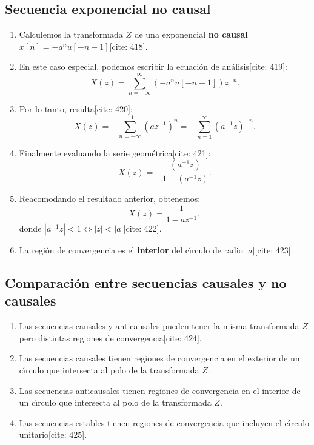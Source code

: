 \documentclass[11pt,a4paper,openany]{book}
\begin{document}
\subsection{Secuencia exponencial no causal}
\begin{enumerate}
	\item Calculemos la transformada $Z$ de una exponencial \textbf{no causal} $x[n] = -a^{n} u[-n-1]$[cite: 418].
	\item En este caso especial, podemos escribir la ecuación de análisis[cite: 419]:
	\begin{equation}
		X(z) = \sum_{n=-\infty}^{\infty} \left( -a^{n} u[-n-1] \right) z^{-n}.
	\end{equation}
	\item Por lo tanto, resulta[cite: 420]:
	\begin{equation}
		X(z) = -\sum_{n=-\infty}^{-1} (a z^{-1})^{n} = -\sum_{n=1}^{\infty} (a^{-1} z)^{-n}.
	\end{equation}
	\item Finalmente evaluando la serie geométrica[cite: 421]:
	\begin{equation}
		X(z) = -\frac{(a^{-1} z)}{1-(a^{-1} z)}.
	\end{equation}
	\item Reacomodando el resultado anterior, obtenemos:
	\begin{equation}
		X(z) = \frac{1}{1-a z^{-1}},
	\end{equation}
	donde $|a^{-1} z| < 1 \Leftrightarrow |z| < |a|$[cite: 422].
	\item La regi\'{o}n de convergencia es el \textbf{interior} del c\'{\i}rculo de radio $|a|$[cite: 423].
\end{enumerate}

\subsection{Comparaci\'{o}n entre secuencias causales y no causales}
\begin{enumerate}
	\item Las secuencias causales y anticausales pueden tener la misma transformada $Z$ pero distintas regiones de convergencia[cite: 424].
	\item Las secuencias causales tienen regiones de convergencia en el exterior de un c\'{\i}rculo que intersecta al polo de la transformada $Z$.
	\item Las secuencias anticausales tienen regiones de convergencia en el interior de un c\'{\i}rculo que intersecta al polo de la transformada $Z$.
	\item Las secuencias estables tienen regiones de convergencia que incluyen el c\'{\i}rculo unitario[cite: 425].
\end{enumerate}
\end{document}
